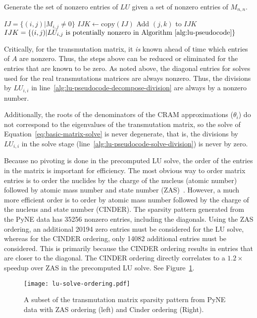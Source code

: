 \begin{algorithm}[h]
  \caption{Generate the set of nonzero entries of $LU$ given a set of nonzero
    entries of $M_{n,n}$.}\label{alg:make-ijk}
  \begin{algorithmic}[1]
  \REQUIRE $IJ=\{(i, j) | M_{i, j} \neq 0\}$
  \STATE $IJK \leftarrow \mathrm{copy}(IJ)$
  \STATE
              \CONTINUE
          \ENDIF
          \STATE
                   \STATE Add $(j, k)$ to $IJK$
               \ENDIF
          \ENDFOR
      \ENDFOR
  \ENDFOR
  \ENSURE $IJK=\{(i,j)|LU_{i,j}\mathrm{\ is\ potentially\ nonzero\ in\ Algorithm~\ref{alg:lu-pseudocode}}\}$
\end{algorithmic}
\end{algorithm}

Critically, for the transmutation matrix, it \textit{is} known ahead of time
which entries of $A$ are nonzero. Thus, the steps above can be reduced or
eliminated for the entries that are known to be zero. As noted above, the
diagonal entries for solves used for the real transmutations matrices are
always nonzero. Thus, the divisions by $LU_{i,i}$ in
line~\ref{alg:lu-pseudocode-decompose-division} are always by a nonzero
number.

Additionally, the roots of the denominators of the CRAM approximations
($\theta_i$) do not correspond to the eigenvalues of the transmutation matrix,
so the solve of Equation~\ref{eq:basic-matrix-solve} is never degenerate, that
is, the divisions by $LU_{i,i}$ in the solve stage
(line~\ref{alg:lu-pseudocode-solve-division}) is never by zero.

Because no pivoting is done in the precomputed LU solve, the order of the
entries in the matrix is important for efficiency. The most obvious way to
order matrix entries is to order the nuclides by the charge of the nucleus
(atomic number) followed by atomic mass number and state number
(ZAS)~\cite{ationneeded}. However, a much more efficient order is to order by
atomic mass number followed by the charge of the nucleus and state number
(CINDER). The sparsity pattern generated from the PyNE data has 35256 nonzero
entries, including the diagonals. Using the ZAS ordering, an additional 20194
zero entries must be considered for the LU solve, whereas for the CINDER
ordering, only 14082 additional entries must be considered. This is primarily
because the CINDER ordering results in entries that are closer to the
diagonal. The CINDER ordering directly correlates to a $1.2\times$ speedup
over ZAS in the precomputed LU solve. See Figure~\ref{fig:lu-solve-ordering}.

\begin{figure}[!ht]
\centering
\texttt{[image: lu-solve-ordering.pdf]}
\caption{A subset of the transmutation matrix sparsity pattern from PyNE data
  with ZAS ordering (left) and Cinder ordering (Right).}
\label{fig:lu-solve-ordering}
\end{figure}
